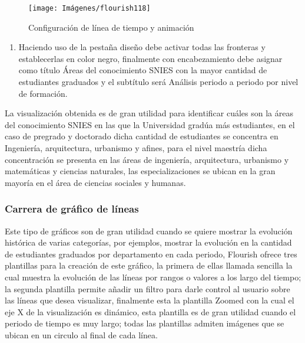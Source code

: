 \documentclass[
]{book}
\providecommand{\tightlist}{%
  \setlength{\itemsep}{0pt}\setlength{\parskip}{0pt}}
\begin{document}
\begin{figure}

{\centering \texttt{[image: Imágenes/flourish118]} 

}

\caption{Configuración de línea de tiempo y animación}\label{fig:paso9carrerabarrasflourish-fig}
\end{figure}

\begin{enumerate}
\def\labelenumi{\arabic{enumi}.}
\setcounter{enumi}{9}
\tightlist
\item
  Haciendo uso de la pestaña diseño debe activar todas las fronteras y establecerlas en color negro, finalmente con encabezamiento debe asignar como título Áreas del conocimiento SNIES con la mayor cantidad de estudiantes graduados y el subtítulo será Análisis periodo a periodo por nivel de formación.
\end{enumerate}

La visualización obtenida es de gran utilidad para identificar cuáles son la áreas del conocimiento SNIES en las que la Universidad gradúa más estudiantes, en el caso de pregrado y doctorado dicha cantidad de estudiantes se concentra en Ingeniería, arquitectura, urbanismo y afines, para el nivel maestría dicha concentración se presenta en las áreas de ingeniería, arquitectura, urbanismo y matemáticas y ciencias naturales, las especializaciones se ubican en la gran mayoría en el área de ciencias sociales y humanas.

\hypertarget{carreradelineasflourish}{%
\subsubsection{Carrera de gráfico de líneas}\label{carreradelineasflourish}}

Este tipo de gráficos son de gran utilidad cuando se quiere mostrar la evolución histórica de varias categorías, por ejemplos, mostrar la evolución en la cantidad de estudiantes graduados por departamento en cada periodo, Flourish ofrece tres plantillas para la creación de este gráfico, la primera de ellas llamada sencilla la cual muestra la evolución de las líneas por rangos o valores a los largo del tiempo; la segunda plantilla permite añadir un filtro para darle control al usuario sobre las líneas que desea visualizar, finalmente esta la plantilla Zoomed con la cual el eje X de la visualización es dinámico, esta plantilla es de gran utilidad cuando el periodo de tiempo es muy largo; todas las plantillas admiten imágenes que se ubican en un circulo al final de cada línea.
\end{document}
